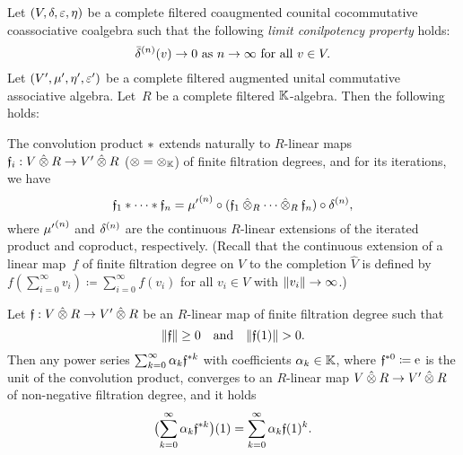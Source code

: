 \documentclass[\MainFolder/Text.tex]{subfiles}
\begin{document}
\begin{Proposition}\label{Prop:ConvPwrSer}
Let $(V,\delta,\varepsilon, \eta)$ be a complete filtered coaugmented counital cocommutative coassociative coalgebra such that the following \emph{limit conilpotency property} holds:
\begin{equation}\label{Eq:LimConilp}
\bar{\delta}^{(n)}(v) \to 0\text{ as }n\to\infty\text{ for all }v\in V.
\end{equation}
Let $(V',\mu',\eta',\varepsilon')$ be a complete filtered augmented unital commutative associative algebra. Let~$R$ be a complete filtered $\mathbb{K}$-algebra. Then the following holds:
\begin{ClaimList}
\item The convolution product $*$ extends naturally to $R$-linear maps $\MVMorF_i: V\COtimes R\rightarrow V'\COtimes R$ ($\otimes = \otimes_{\mathbb{K}}$) of finite filtration degrees, and for its iterations, we have
\begin{equation}\label{Eq:ItStarProd}
\MVMorF_1\Star\dotsb\Star\MVMorF_n = {\MVProd'}^{(n)}\circ(\MVMorF_1\COtimes_R\dotsb\COtimes_R\MVMorF_n)\circ \MVCoProd^{(n)},
\end{equation}
where ${\mu'}^{(n)}$ and $\delta^{(n)}$ are the continuous $R$-linear extensions of the iterated product and coproduct, respectively. (Recall that the continuous extension of a linear map~$f$ of finite filtration degree on $V$ to the completion $\hat{V}$ is defined by $f(\sum_{i=0}^\infty v_i) \coloneqq \sum_{i=0}^\infty f(v_i)$ for all $v_i\in V$ with $\| v_i \|\to\infty$.)
\item Let $\MVMorF: V\COtimes R\rightarrow V'\COtimes R$ be an $R$-linear map of finite filtration degree such that 
\begin{equation}\label{Eq:ConditionsPowerSeries}
\Norm{\MVMorF}\ge 0\quad\text{and}\quad\Norm{\MVMorF(1)}>0.
\end{equation}
Then any power series $\sum_{k=0}^\infty \alpha_k \mathfrak{f}^{* k}$ with coefficients $\alpha_k\in \mathbb{K}$, where $\mathfrak{f}^{* 0}\coloneqq \mathrm{e}$ is the unit of the convolution product, converges to an $R$-linear map $V\COtimes R \rightarrow V'\COtimes R$ of non-negative filtration degree, and it holds
$$ \bigl(\sum_{k=0}^\infty \alpha_k \mathfrak{f}^{* k}\bigr)(1) = \sum_{k=0}^\infty \alpha_k \mathfrak{f}(1)^k. $$
\end{ClaimList}
\end{Proposition}
\end{document}
